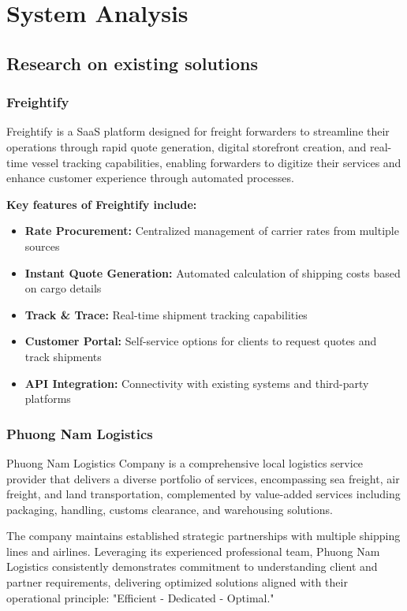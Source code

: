 \chapter{System Analysis}
\section{Research on existing solutions}
\subsection{Freightify}
Freightify \cite{freightify} is a SaaS platform designed for freight forwarders to streamline their operations through rapid quote generation, digital storefront creation, and real-time vessel tracking capabilities, enabling forwarders to digitize their services and enhance customer experience through automated processes.

\textbf{Key features of Freightify include:}
\begin{itemize}
    \item \textbf{Rate Procurement:} Centralized management of carrier rates from multiple sources
    \item \textbf{Instant Quote Generation:} Automated calculation of shipping costs based on cargo details
    \item \textbf{Track \& Trace:} Real-time shipment tracking capabilities
    \item \textbf{Customer Portal:} Self-service options for clients to request quotes and track shipments
    \item \textbf{API Integration:} Connectivity with existing systems and third-party platforms
\end{itemize}

\subsection{Phuong Nam Logistics}
Phuong Nam Logistics Company is a comprehensive local logistics service provider that delivers a diverse portfolio of services, encompassing sea freight, air freight, and land transportation, complemented by value-added services including packaging, handling, customs clearance, and warehousing solutions.

The company maintains established strategic partnerships with multiple shipping lines and airlines. Leveraging its experienced professional team, Phuong Nam Logistics consistently demonstrates commitment to understanding client and partner requirements, delivering optimized solutions aligned with their operational principle: "Efficient - Dedicated - Optimal."

